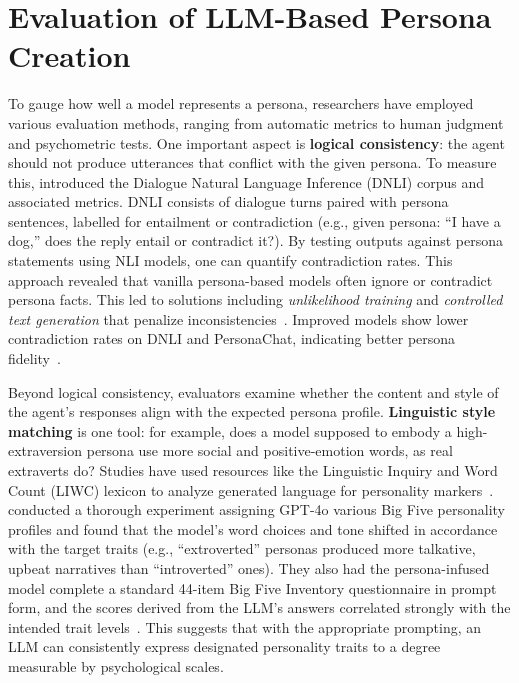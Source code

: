 \section{Evaluation of LLM-Based Persona Creation}
To gauge how well a model represents a persona, researchers have employed various evaluation methods, ranging from automatic metrics to human judgment and psychometric tests. One important aspect is \textbf{logical consistency}: the agent should not produce utterances that conflict with the given persona. To measure this, \citet{welleck-etal-2019-dialogueNLI} introduced the Dialogue Natural Language Inference (DNLI) corpus and associated metrics. DNLI consists of dialogue turns paired with persona sentences, labelled for entailment or contradiction (e.g., given persona: ``I have a dog,'' does the reply entail or contradict it?). By testing outputs against persona statements using NLI models, one can quantify contradiction rates. This approach revealed that vanilla persona-based models often ignore or contradict persona facts. This led to solutions including \emph{unlikelihood training} and \emph{controlled text generation} that penalize inconsistencies~\cite{li-etal-2020-dont, kim-etal-2020-will}. Improved models show lower contradiction rates on DNLI and PersonaChat, indicating better persona fidelity~\cite{kim-etal-2020-will}.

Beyond logical consistency, evaluators examine whether the content and style of the agent's responses align with the expected persona profile. \textbf{Linguistic style matching} is one tool: for example, does a model supposed to embody a high-extraversion persona use more social and positive-emotion words, as real extraverts do? Studies have used resources like the Linguistic Inquiry and Word Count (LIWC) lexicon to analyze generated language for personality markers~\cite{jiang-etal-2023-personallm}. \citet{jiang-etal-2023-personallm} conducted a thorough experiment assigning GPT-4o various Big Five personality profiles and found that the model's word choices and tone shifted in accordance with the target traits (e.g., ``extroverted'' personas produced more talkative, upbeat narratives than ``introverted'' ones). They also had the persona-infused model complete a standard 44-item Big Five Inventory questionnaire in prompt form, and the scores derived from the LLM's answers correlated strongly with the intended trait levels~\cite{jiang-etal-2023-personallm}. This suggests that with the appropriate prompting, an LLM can consistently express designated personality traits to a degree measurable by psychological scales.

